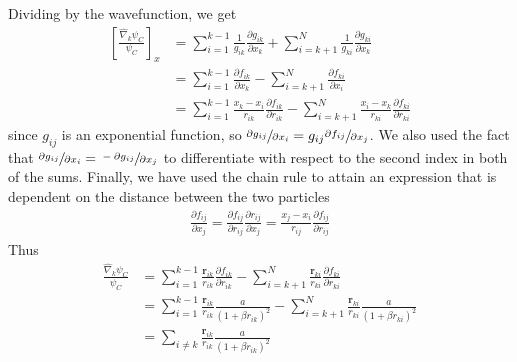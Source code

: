 \documentclass[twocolumn,12pt]{extarticle}
\newcommand{\eq}[1]{{\small\begin{align*}#1\end{align*}}}
\renewcommand\vec[1]{\mathbf{#1}}
\newcommand{\op}[1]{\hat{#1}}
\begin{document}
Dividing by the wavefunction, we get
\eq{
  \left[\frac{\op\nabla_k\psi_C}{\psi_C}\right]_x
  &=\sum_{i=1}^{k-1}\frac{1}{g_{ik}}\frac{\partial g_{ik}}{\partial x_k}  
  + \sum_{i=k+1}^{N}\frac{1}{g_{ki}}\frac{\partial g_{ki}}{\partial x_k} \\
  &=\sum_{i=1}^{k-1}\frac{\partial f_{ik}}{\partial x_k}  
  - \sum_{i=k+1}^{N}\frac{\partial f_{ki}}{\partial x_i}\\
  &=\sum_{i=1}^{k-1}\frac{x_k-x_i}{r_{ik}}\frac{\partial f_{ik}}{\partial r_{ik}}  
  - \sum_{i=k+1}^{N}\frac{x_i-x_k}{r_{ki}}\frac{\partial f_{ki}}{\partial r_{ki}}
}
since $g_{ij}$ is an exponential function, so
$\sfrac{\partial g_{ij}}{\partial x_i} = g_{ij} \sfrac{\partial f_{ij}}{\partial x_j}$.
We also used the fact that $\sfrac{\partial g_{ij}}{\partial x_i} = \sfrac{-\partial g_{ij}}{\partial x_j}$ to differentiate with respect to the second index in both of the sums.
Finally, we have used the chain rule to attain an expression that is dependent
on the distance between the two particles
\eq{
  \frac{\partial f_{ij}}{\partial x_j} 
  = \frac{\partial f_{ij}}{\partial r_{ij}} \frac{\partial r_{ij}}{\partial x_j} 
  = \frac{x_j - x_i}{r_{ij}} \frac{\partial f_{ij}}{\partial r_{ij}}
}
Thus
\eq{
  \frac{\op\nabla_k\psi_C}{\psi_C} &=
    \sum_{i=1}^{k-1}\frac{\vec r_{ik}}{r_{ik}}\frac{\partial f_{ik}}{\partial r_{ik}}  
    - \sum_{i=k+1}^{N}\frac{\vec r_{ki}}{r_{ki}}\frac{\partial f_{ki}}{\partial r_{ki}}\\
    &=\sum_{i=1}^{k-1}\frac{\vec r_{ik}}{r_{ik}}\frac{a}{(1+\beta r_{ik})^2}  
    - \sum_{i=k+1}^{N}\frac{\vec r_{ki}}{r_{ki}}\frac{a}{(1+\beta r_{ki})^2}\\
    &=\sum_{i\neq k}\frac{\vec r_{ik}}{r_{ik}}\frac{a}{(1+\beta r_{ik})^2} 
}
\end{document}
